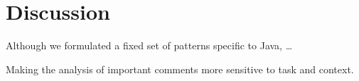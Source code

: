 \chapter{Discussion}
\label{ch:Discussion}

Although we formulated a fixed set of patterns specific to Java, \dots {}

Making the analysis of important comments more sensitive to task and context.